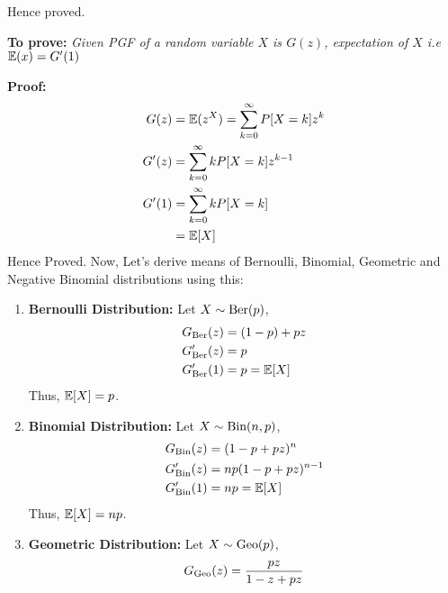 \begin{solution}
	Hence proved.





	\textbf{To prove:} \textit{Given PGF of a random variable $X$ is $G(z)$, expectation of $X$ i.e $\mathbb{E}(x) = G'(1)$}

	\textbf{Proof:} \begin{align}
		G(z)  & = \mathbb{E}(z^X) = \sum_{k=0}^\infty P[X=k]z^k \\
		G'(z) & = \sum_{k=0}^\infty kP[X=k]z^{k-1}      \\
		G'(1) & = \sum_{k=0}^\infty kP[X=k]             \\
		      & = \mathbb{E}[X]
	\end{align}
	Hence Proved.
	Now, Let's derive means of Bernoulli, Binomial, Geometric and Negative Binomial
	distributions using this:
	\begin{enumerate}
		\item \textbf{Bernoulli Distribution:} Let $X\sim\text{Ber}(p)$,
		      \begin{align}
			      G_{\text{Ber}}(z)  & = (1-p) + pz \\
			      G'_{\text{Ber}}(z) & = p          \\
			      G'_{\text{Ber}}(1) & = p = \mathbb{E}[X]
		      \end{align}
		      Thus, $\mathbb{E}[X] = p$.
		\item \textbf{Binomial Distribution:} Let $X\sim\text{Bin}(n,p)$,
		      \begin{align}
			      G_{\text{Bin}}(z)  & = (1-p + pz)^n       \\
			      G'_{\text{Bin}}(z) & = np(1-p + pz)^{n-1} \\
			      G'_{\text{Bin}}(1) & = np = \mathbb{E}[X]
		      \end{align}
		      Thus, $\mathbb{E}[X] = np$.
		\item \textbf{Geometric Distribution:} Let $X\sim\text{Geo}(p)$,
		      \begin{align}
			      G_\Geo(z)  & = \frac{pz}{1-z+pz}                      \\

\end{align}
\end{enumerate}
\end{solution}
